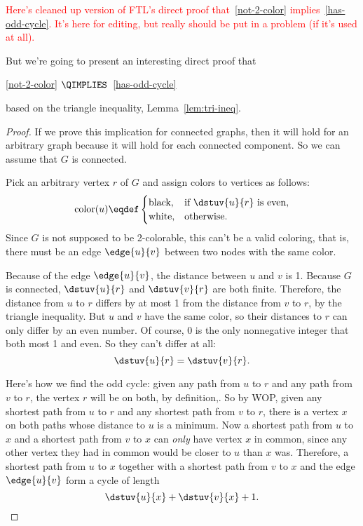 \begin{editingnotes}

\textcolor{red}{Here's cleaned up version of FTL's direct proof
  that~\ref{not-2-color} implies~\ref{has-odd-cycle}.  It's here for
  editing, but really should be put in a problem (if it's used at
  all).}

But we're going to present an interesting direct proof that

\ref{not-2-color} $\QIMPLIES$~\ref{has-odd-cycle}

based on the triangle inequality, Lemma~\ref{lem:tri-ineq}.

\begin{proof}
If we prove this implication for connected graphs, then it will hold
for an arbitrary graph because it will hold for each connected
component.  So we can assume that $G$ is connected.

Pick an arbitrary vertex $r$ of $G$ and assign colors to vertices as
follows:
\begin{equation}\label{colorurule}
\text{color}(u) \eqdef
             \begin{cases}
                   \text{black}, & \text{if $\dstuv{u}{r}$ is even},\\
                   \text{white}, & \text{otherwise}.
             \end{cases}
\end{equation}
Since $G$ is not supposed to be 2-colorable, this can't be a valid
coloring, that is, there must be an edge $\edge{u}{v}$ between two nodes
with the same color.

Because of the edge $\edge{u}{v}$, the distance between $u$ and $v$ is
1.  Because $G$ is connected, $\dstuv{u}{r}$ and $\dstuv{v}{r}$ are
both finite.  Therefore, the distance from $u$ to $r$ differs by at
most 1 from the distance from $v$ to $r$, by the triangle inequality.
But $u$ and $v$ have the same color, so their distances to $r$ can
only differ by an even number.  Of course, 0 is the only nonnegative
integer that both most 1 and even.  So they can't differ at all:
\begin{equation}\label{dstur=vr}
\dstuv{u}{r} = \dstuv{v}{r}.
\end{equation}

Here's how we find the odd cycle: given any path from $u$ to $r$ and
any path from $v$ to $r$, the vertex $r$ will be on both, by
definition,.  So by WOP, given any shortest path from $u$ to $r$ and
any shortest path from $v$ to $r$, there is a vertex $x$ on both paths
whose distance to $u$ is a minimum.  Now a shortest path from $u$ to
$x$ and a shortest path from $v$ to $x$ can \emph{only} have vertex
$x$ in common, since any other vertex they had in common would be
closer to $u$ than $x$ was.  Therefore, a shortest path from $u$ to
$x$ together with a shortest path from $v$ to $x$ and the edge
$\edge{u}{v}$ form a cycle of length
\begin{equation}\label{uxvx1}
\dstuv{u}{x}+  \dstuv{v}{x} +1.
\end{equation}


\end{proof}
\end{editingnotes}
